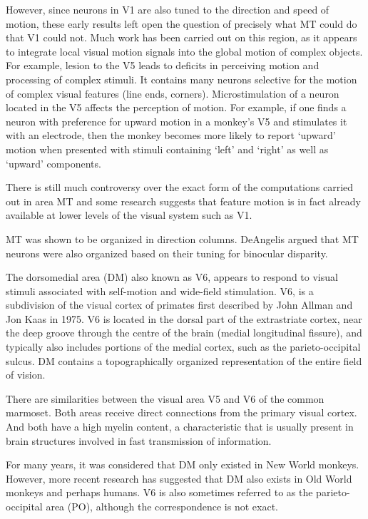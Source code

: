 However, since neurons in V1 are also tuned to the direction and speed of motion, these early results left open the question of precisely what MT could do that V1 could not. Much work has been carried out on this region, as it appears to integrate local visual motion signals into the global motion of complex objects. For example, lesion to the V5 leads to deficits in perceiving motion and processing of complex stimuli. It contains many neurons selective for the motion of complex visual features (line ends, corners). Microstimulation of a neuron located in the V5 affects the perception of motion. For example, if one finds a neuron with preference for upward motion in a monkey's V5 and stimulates it with an electrode, then the monkey becomes more likely to report `upward' motion when presented with stimuli containing `left' and `right' as well as `upward' components.

There is still much controversy over the exact form of the computations carried out in area MT and some research suggests that feature motion is in fact already available at lower levels of the visual system such as V1.

MT was shown to be organized in direction columns. DeAngelis argued that MT neurons were also organized based on their tuning for binocular disparity.

The dorsomedial area (DM) also known as V6, appears to respond to visual stimuli associated with self-motion and wide-field stimulation. V6, is a subdivision of the visual cortex of primates first described by John Allman and Jon Kaas in 1975. V6 is located in the dorsal part of the extrastriate cortex, near the deep groove through the centre of the brain (medial longitudinal fissure), and typically also includes portions of the medial cortex, such as the parieto-occipital sulcus. DM contains a topographically organized representation of the entire field of vision.

There are similarities between the visual area V5 and V6 of the common marmoset. Both areas receive direct connections from the primary visual cortex. And both have a high myelin content, a characteristic that is usually present in brain structures involved in fast transmission of information.

For many years, it was considered that DM only existed in New World monkeys. However, more recent research has suggested that DM also exists in Old World monkeys and perhaps humans. V6 is also sometimes referred to as the parieto-occipital area (PO), although the correspondence is not exact.


